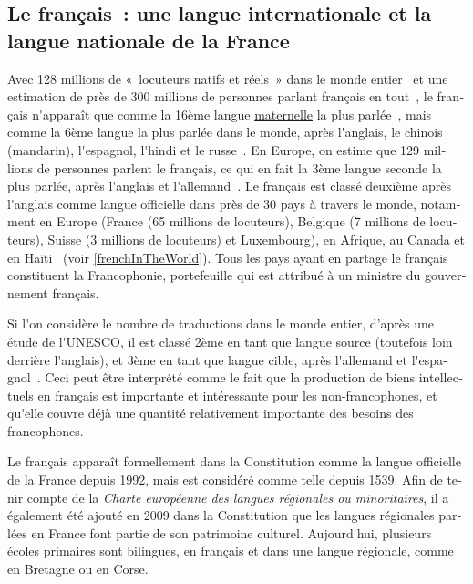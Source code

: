\documentclass[]{../metanetpaper}
\begin{document}
\begin{french}
\clearpage



\begin{multicols}{2}

\subsection{Le français~: une langue internationale et la langue nationale de la France}
Avec 128 millions de «~locuteurs natifs et réels~» dans le monde
entier~\cite{native} et une estimation de près de 300 millions de
personnes parlant français en tout~\cite{francais}, le français
n{\mbox '}apparaît que comme la 16ème langue \underline{maternelle} la plus
parlée~\cite{Lewis2009}, mais comme la 6ème langue la plus parlée dans
le monde, après l{\mbox '}anglais, le chinois (mandarin), l{\mbox '}espagnol, l{\mbox '}hindi et
le russe~\cite{russe}. En Europe, on estime que 129 millions de
personnes parlent le français, ce qui en fait la 3ème langue seconde la
plus parlée, après l{\mbox '}anglais et l{\mbox '}allemand~\cite{francais}. Le français est classé
deuxième après l{\mbox '}anglais comme langue officielle dans près de 30 pays
à travers le monde, notamment en Europe (France (65 millions de
locuteurs), Belgique (7 millions de locuteurs), Suisse (3 millions de
locuteurs) et Luxembourg), en Afrique, au Canada et en
Haïti~\cite{haiti} (voir \ref{frenchInTheWorld}). Tous les pays ayant en partage le
français constituent la Francophonie, portefeuille qui est attribué à
un ministre du gouvernement français.

Si l{\mbox '}on considère le nombre de traductions dans le monde
entier, d'après une étude de l{\mbox '}UNESCO, il est classé 2ème en
tant que langue source (toutefois loin derrière l{\mbox '}anglais), et
3ème en tant que langue cible, après l{\mbox '}allemand et l{\mbox
 '}espagnol~\cite{espagnol}. Ceci peut être interprété comme le fait
que la production de biens intellectuels en français est importante et
intéressante pour les non-francophones, et qu{\mbox '}elle couvre déjà
une quantité relativement importante des besoins des francophones.

Le français apparaît formellement dans la Constitution comme la langue
officielle de la France depuis 1992, mais est considéré comme telle
depuis 1539. Afin de tenir compte de la {\em Charte européenne des langues
régionales ou minoritaires}, il a également été ajouté en 2009 dans la
Constitution que les langues régionales parlées en France font partie
de son patrimoine culturel. Aujourd{\mbox '}hui, plusieurs écoles primaires
sont bilingues, en français et dans une langue régionale, comme en
Bretagne ou en Corse.


\end{multicols}
\end{french}
\end{document}
